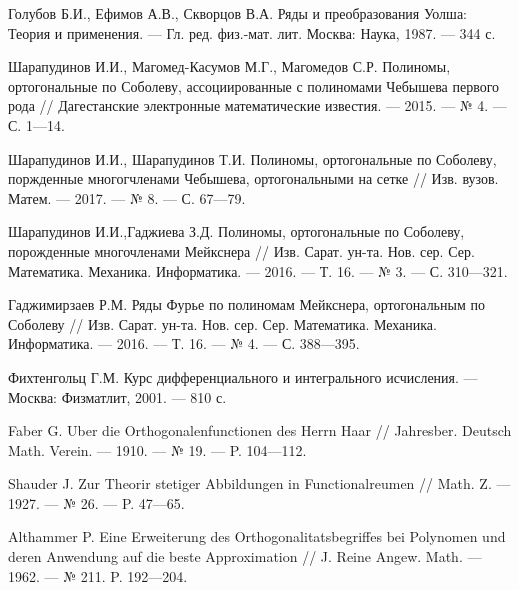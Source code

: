 \begin{thebibliography}{99}
Голубов Б.И., Ефимов А.В., Скворцов В.А. Ряды и преобразования Уолша: Теория и применения. --- Гл. ред. физ.-мат. лит. Москва: Наука, 1987. --- 344 с.





Шарапудинов И.И., Магомед-Касумов М.Г., Магомедов С.Р. Полиномы, ортогональные по Соболеву, ассоциированные с полиномами Чебышева первого рода // Дагестанские электронные математические известия. --- 2015. --- № 4. --- С. 1---14.





Шарапудинов И.И., Шарапудинов Т.И. Полиномы, ортогональные по Соболеву, поржденные многогчленами Чебышева, ортогональными на сетке // Изв. вузов. Матем. --- 2017. --- № 8. --- С. 67---79.





Шарапудинов И.И.,Гаджиева  З.Д. Полиномы, ортогональные по Соболеву, порожденные многочленами Мейкснера // Изв. Сарат. ун-та. Нов. сер. Сер. Математика. Механика. Информатика. --- 2016. --- Т. 16. --- № 3. --- С. 310---321.





Гаджимирзаев Р.М. Ряды Фурье по полиномам Мейкснера, ортогональным по Соболеву // Изв. Сарат. ун-та. Нов. сер. Сер. Математика. Механика. Информатика. --- 2016. --- Т. 16. --- № 4. --- С. 388---395.





Фихтенгольц Г.М. Курс дифференциального и интегрального исчисления. --- Москва: Физматлит, 2001. --- 810 с.






Faber G. Uber die Orthogonalenfunctionen des Herrn Haar // Jahresber. Deutsch Math. Verein. --- 1910. --- № 19. --- P. 104---112.





Shauder J. Zur Theorir stetiger Abbildungen in Functionalreumen // Math. Z. --- 1927. --- № 26. --- P. 47---65.





Althammer P. Eine Erweiterung des Orthogonalitatsbegriffes bei Polynomen und deren Anwendung  auf die beste Approximation // J. Reine Angew. Math. --- 1962. --- № 211. P. 192---204.






\end{thebibliography}
